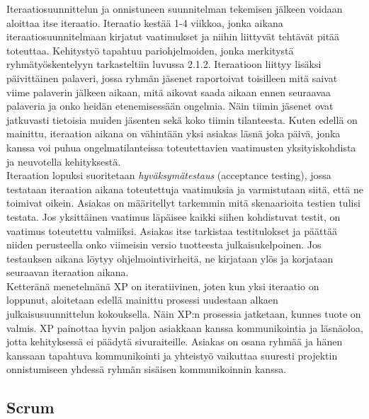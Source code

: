 \documentclass[finnish]{../tktltiki2}
\theoremstyle{definition}
\theoremstyle{remark}
\begin{document}
Iteraatiosuunnittelun ja onnistuneen suunnitelman tekemisen jälkeen voidaan aloittaa itse iteraatio. Iteraatio kestää 1-4 viikkoa, jonka aikana iteraatiosuunnitelmaan kirjatut vaatimukset ja niihin liittyvät tehtävät pitää toteuttaa. Kehitystyö tapahtuu pariohjelmoiden, jonka
merkitystä ryhmätyöskentelyyn tarkasteltiin luvussa 2.1.2. Iteraatioon liittyy lisäksi päivittäinen palaveri, jossa ryhmän jäsenet raportoivat toisilleen mitä saivat viime palaverin jälkeen aikaan, mitä aikovat saada aikaan ennen seuraavaa palaveria ja onko heidän etenemisessään ongelmia. Näin tiimin jäsenet ovat jatkuvasti tietoisia
muiden jäsenten sekä koko tiimin tilanteesta. Kuten edellä on mainittu, iteraation aikana on vähintään yksi asiakas läsnä joka päivä, jonka kanssa voi puhua ongelmatilanteissa toteutettavien vaatimusten yksityiskohdista ja neuvotella kehityksestä.\\

Iteraation lopuksi suoritetaan \emph{hyväksymätestaus} (acceptance testing), jossa testataan iteraation aikana toteutettuja vaatimuksia ja varmistutaan siitä, että ne toimivat oikein. Asiakas on määritellyt tarkemmin mitä skenaarioita testien tulisi testata. Jos yksittäinen vaatimus läpäisee kaikki siihen kohdistuvat testit, on vaatimus toteutettu valmiiksi. Asiakas itse tarkistaa testitulokset ja päättää niiden perusteella onko viimeisin versio tuotteesta julkaisukelpoinen. Jos testauksen aikana löytyy ohjelmointivirheitä, ne kirjataan ylös ja korjataan seuraavan iteraation aikana.\\

Ketteränä menetelmänä XP on iteratiivinen, joten kun yksi iteraatio on loppunut, aloitetaan edellä mainittu prosessi uudestaan alkaen julkaisusuunnittelun kokouksella. Näin XP:n prosessia jatketaan, kunnes tuote on valmis. XP painottaa hyvin paljon asiakkaan kanssa kommunikointia ja läsnäoloa, jotta kehityksessä ei päädytä sivuraiteille. Asiakas on osana ryhmää ja hänen kanssaan tapahtuva kommunikointi ja yhteistyö vaikuttaa suuresti projektin onnistumiseen yhdessä ryhmän sisäisen kommunikoinnin kanssa.

\subsection{Scrum}
\end{document}
